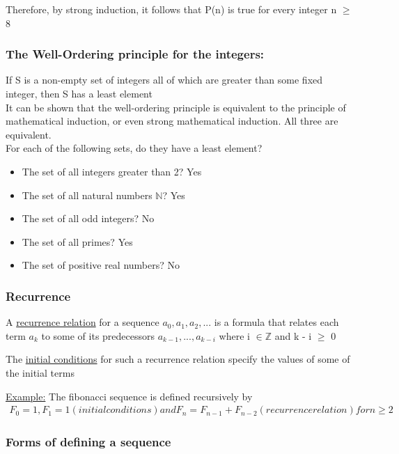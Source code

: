 \documentclass{article}
\begin{document}
Therefore, by strong induction, it follows that P(n) is true for every integer n $\geq$ 8

\subsubsection{The Well-Ordering principle for the integers:}

If S is a non-empty set of integers all of which are greater than some fixed integer, then S has a least element \\

It can be shown that the well-ordering principle is equivalent to the principle of mathematical induction, or even strong mathematical induction. All three are equivalent. \\

For each of the following sets, do they have a least element?
\begin{itemize}
\item The set of all integers greater than 2? Yes
\item The set of all natural numbers $\mathbb{N}$? Yes
\item The set of all odd integers? No
\item The set of all primes? Yes
\item The set of positive real numbers? No
\end{itemize}

\subsubsection{Recurrence}

A \underline{recurrence relation} for a sequence $a_{0},a_{1},a_{2},...$ is a formula that relates each term $a_{k}$ to some of its predecessors $a_{k-1}, ..., a_{k-i}$ where i $\in \mathbb{Z}$ and k - i $\geq$ 0 

The \underline{initial conditions} for such a recurrence relation specify the values of some of the initial terms

\underline{Example:} The fibonacci sequence is defined recursively by
\begin{align}
F_{0} = 1, F_{1} = 1 (initial conditions) and F_{n} = F_{n-1} + F_{n-2} (recurrence relation) for n \geq 2
\end{align}

\subsubsection{Forms of defining a sequence}
\end{document}
